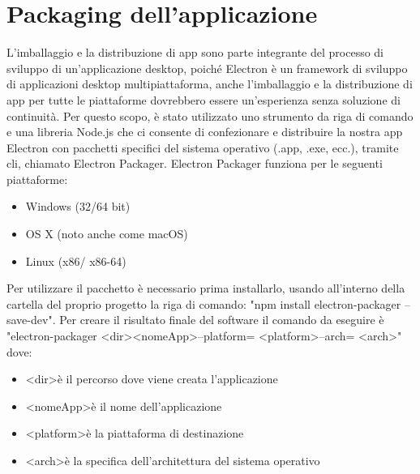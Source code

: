 
\newpage

\section{Packaging dell'applicazione}

L'imballaggio e la distribuzione di app sono parte integrante del processo di sviluppo di un'applicazione desktop, poiché Electron è un framework di sviluppo di applicazioni desktop multipiattaforma, anche l'imballaggio e la distribuzione di app per tutte le piattaforme dovrebbero essere un'esperienza senza soluzione di continuità.
Per questo scopo, è stato utilizzato uno strumento da riga di comando e una libreria Node.js che ci consente di confezionare e distribuire la nostra app Electron con pacchetti specifici del sistema operativo (.app, .exe, ecc.), tramite \Gls{cli}, chiamato Electron Packager. Electron Packager funziona per le seguenti piattaforme:
\begin{itemize}
	\item Windows (32/64 bit)
	\item OS X (noto anche come macOS)
	\item Linux (x86/ x86-64)
\end{itemize}


Per utilizzare il pacchetto è necessario prima installarlo, usando all'interno della cartella del proprio progetto la riga di comando: "npm install electron-packager --save-dev".
Per creare il risultato finale del software il comando da eseguire è "electron-packager \textless dir\textgreater  \textless nomeApp\textgreater  --platform= \textless platform\textgreater  --arch= \textless arch\textgreater" dove:
\begin{itemize}
	\item  \textless dir\textgreater  è il percorso dove viene creata l'applicazione
	\item  \textless nomeApp\textgreater  è il nome dell'applicazione
	\item  \textless platform\textgreater  è la piattaforma di destinazione
	\item  \textless arch\textgreater  è la specifica dell'architettura del sistema operativo
\end{itemize}




